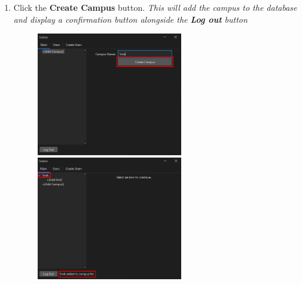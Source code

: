 \begin{enumerate}
    \item Click the \textbf{Create Campus} button. \textit{This will add the campus to the database and display a confirmation button alongside the \textbf{Log out} button}
    \begin{figure}[H]
        \centering
        \includegraphics[width=0.6\textwidth]{MainTab/AddCampus/addCampusCreate.PNG}
        \includegraphics[width=0.6\textwidth]{MainTab/AddCampus/addCampusCreated.PNG}
    \end{figure}
\end{enumerate}

